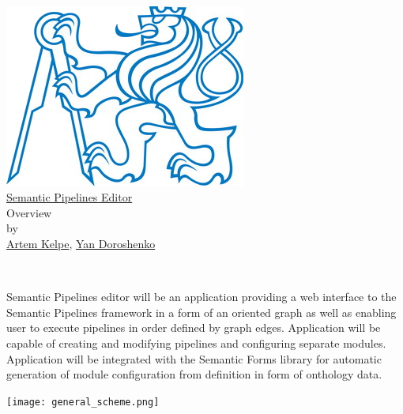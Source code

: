 \documentclass{article}
\begin{document}
\begin{center}
    \rule{0pt}{0pt}\\
    \vfill
    \includegraphics[scale=0.8]{logo.png}\\
    {\huge \href{https://gitlab.fel.cvut.cz/dorosyan/SPEd}{Semantic Pipelines Editor}\\}
    {\Large Overview\\}
    by\\
    {\large \href{mailto:kelpeart@fel.cvut.cz}{Artem Kelpe}, \href{mailto:dorosyan@fel.cvut.cz}{Yan Doroshenko}\\}
    \vfill
    \rule{0pt}{90pt}\\
\end{center}
\newpage
Semantic Pipelines editor will be an application providing a web interface to the Semantic Pipelines framework in a form of an oriented graph as well as enabling user to execute pipelines in order defined by graph edges. Application will be capable of creating and modifying pipelines and configuring separate modules. Application will be integrated with the Semantic Forms library for automatic generation of module configuration from definition in form of onthology data.\\
\begin{center}
    \texttt{[image: general\_scheme.png]}
\end{center}
\end{document}
